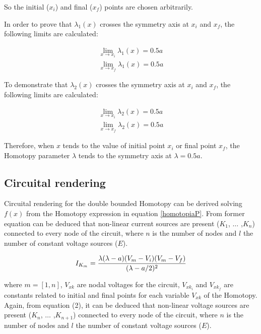\documentclass[journal,twocolumn]{IEEEtran}
\begin{document}
So the initial ($x_i$) and final ($x_f$) points are chosen arbitrarily.

In order to prove that $\lambda_1(x)$ crosses the symmetry axis at $x_i$ and $x_f$, the following limits are calculated:

\begin{equation}
\begin{array}{r}
 \displaystyle\lim_{x \to{x_i}}{\lambda_1(x)}=0.5a \\
  \displaystyle\lim_{x \to{x_f}}{\lambda_1(x)}=0.5a 
 \end{array}
 \label{simetriax2}
\end{equation}

To demonstrate that $\lambda_2(x)$ crosses the symmetry axis at $x_i$ and $x_f$, the following limits are calculated:

\begin{equation}
\begin{array}{r}
 \displaystyle\lim_{x \to{x_i}}{\lambda_2(x)}=0.5a \\
  \displaystyle\lim_{x \to{x_f}}{\lambda_2(x)}=0.5a 
 \end{array}
 \label{simetriax3}
\end{equation}

Therefore, when $x$ tends to the value of initial point $x_i$ or final point $x_f$, the Homotopy parameter $\lambda$ tends to the symmetry axis at $\lambda=0.5a$.

\subsection{Circuital rendering}

Circuital rendering for the double bounded Homotopy can be derived solving $f(x)$ from the Homotopy expression in equation \ref{homotopiaP}. From former equation can be deduced that non-linear current sources are present ($K_1$, $\hdots$ ,$K_n$) connected to every node of the circuit, where $n$ is the number of nodes and $l$ the number of constant voltage sources ($E$).

\begin{equation}
I_{K_m}={\lambda(\lambda-a)(V_{m}-V_{i})(V_{m}-V_{f}) \over (\lambda-a/2)^2}
\label{Ikn}
\end{equation}

where $m=[1,n]$, $V_{xk}$ are nodal voltages for the circuit, $V_{{xk}_i}$ and $V_{{xk}_f}$ are constants related to initial and final points for each variable $V_{xk}$ of the Homotopy. Again, from equation (2), it can be deduced that non-linear voltage sources are present ($K_n$, $\hdots$ ,$K_{n+1}$) connected to every node of the circuit, where $n$ is the number of nodes and $l$ the number of constant voltage sources ($E$).
\end{document}
